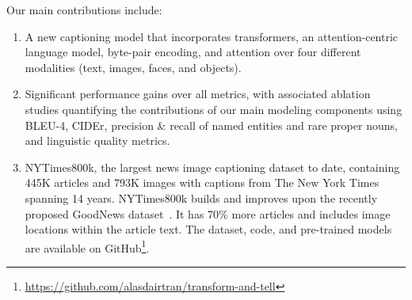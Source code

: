 Our main contributions include:

\begin{enumerate}
	\itemsep0em
   \item A new captioning model that incorporates transformers, an
   attention-centric language model, byte-pair encoding, and attention over
   four different modalities (text, images, faces, and objects). 

   \item Significant performance gains over all metrics, with associated
   ablation studies quantifying the contributions of our main modeling
   components using BLEU-4, CIDEr, precision \& recall of named entities and
   rare proper nouns, and linguistic quality metrics.

	\item NYTimes800k, the largest news image captioning dataset to date,
	containing 445K articles and 793K images with captions from The New York
	Times spanning 14 years. NYTimes800k builds and improves upon the recently
	proposed GoodNews dataset~\cite{Biten2019GoodNews}. It has 70\% more
	articles and includes image locations within the article text. The dataset,
	code, and pre-trained models are available on
	GitHub\footnote{\href{https://github.com/alasdairtran/transform-and-tell}{https://github.com/alasdairtran/transform-and-tell}}.
\end{enumerate}
